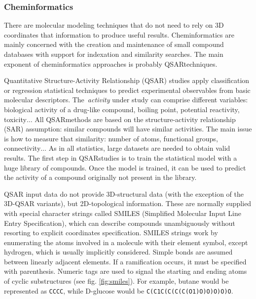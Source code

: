 \subsubsection{Cheminformatics}
There are molecular modeling techniques that do not need to rely on 3D coordinates that information to produce useful results. Cheminformatics are mainly concerned with the creation and maintenance of small compound databases with support for indexation and similarity searches. The main exponent of cheminformatics approaches is probably QSARtechniques.

Quantitative Structure-Activity Relationship (QSAR) studies apply classification or regression statistical techniques to predict experimental observables from basic molecular descriptors. The\ \textit{activity} under study can comprise different variables: biological activity of a drug-like compound, boiling point, potential reactivity, toxicity$ \ldots $  All QSARmethods are based on the structure-activity relationship (SAR) assumption: similar compounds will have similar activities. The main issue is how to measure that similarity: number of atoms, functional groups, connectivity$ \ldots $   As in all statistics, large datasets are needed to obtain valid results. The first step in QSARstudies is to train the statistical model with a huge library of compounds. Once the model is trained, it can be used to predict the activity of a compound originally not present in the library.

QSAR input data do not provide 3D-structural data (with the exception of the 3D-QSAR variants), but 2D-topological information. These are normally supplied with special character strings called SMILES (Simplified Molecular Input Line Entry Specification),\cite{smiles} which can describe compounds unambiguously without resorting to explicit coordinates specification. SMILES strings work by enumerating the atoms involved in a molecule with their element symbol, except hydrogen, which is usually implicitly considered. Simple bonds are assumed between linearly adjacent elements. If a ramification occurs, it must be specified with parenthesis. Numeric tags are used to signal the starting and ending atoms of cyclic substructures (see fig. \ref{fig:smiles}). For example, butane would be represented as \texttt{CCCC}, while D-glucose would be \texttt{C(C1C(C(C(C(O1)O)O)O)O)O}.


